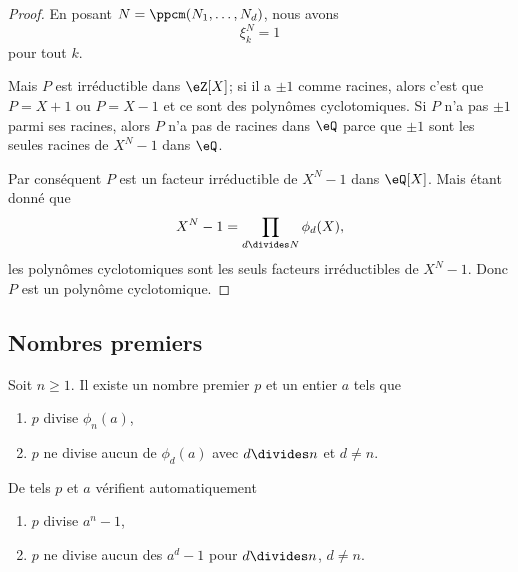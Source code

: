 \begin{proof}
    En posant \( N=\ppcm(N_1,\ldots, N_d)\), nous avons
    \begin{equation}
        \xi_k^N=1
    \end{equation}
    pour tout \( k\).

    Mais \( P\) est irréductible dans \( \eZ[X]\); si il a \( \pm 1\) comme racines, alors c'est que \( P=X+1\) ou \( P=X-1\) et ce sont des polynômes cyclotomiques. Si \( P\) n'a pas \( \pm 1\) parmi ses racines, alors \( P\) n'a pas de racines dans \( \eQ\) parce que \( \pm 1\) sont les seules racines de \( X^N-1\) dans \( \eQ\).

    Par conséquent \( P\) est un facteur irréductible de \( X^N-1\) dans \( \eQ[X]\). Mais étant donné que
    \begin{equation}
        X^N-1=\prod_{d\divides N}\phi_d(X),
    \end{equation}
    les polynômes cyclotomiques sont les seuls facteurs irréductibles de \( X^N-1\). Donc \( P\) est un polynôme cyclotomique.
\end{proof}

\subsection{Nombres premiers}

\begin{lemma}    \label{LemiAqLEn}
    Soit \( n\geq 1\). Il existe un nombre premier \( p\) et un entier \( a\) tels que
    \begin{enumerate}
        \item
            \( p\) divise \( \phi_n(a)\),
        \item
            \( p\) ne divise aucun de \( \phi_d(a)\) avec \( d\divides n\) et \( d\neq n\).
    \end{enumerate}
    De tels \( p\) et \( a\) vérifient automatiquement
    \begin{enumerate}
        \item
            \( p\) divise \( a^n-1\),
        \item
            \( p\) ne divise aucun des \( a^d-1\) pour \( d\divides n\), \( d\neq n\).
    \end{enumerate}
\end{lemma}

